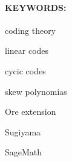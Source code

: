 \paragraph{KEYWORDS:}
\begin{itemize*}[label=,itemsep=1em,itemjoin=\hspace{1em}]
  \item coding theory
  \item linear codes
  \item cycic codes
  \item skew polynomias
  \item Ore extension
  \item Sugiyama
  \item SageMath
\end{itemize*}

\endinput
